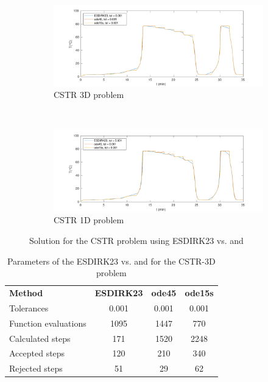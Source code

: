 \begin{figure}[H]
    \centering
    \begin{subfigure}{0.8\linewidth}
        \centering
        \includegraphics[width=1\linewidth]{images/8/8_6_3D.pdf} 
        \caption{CSTR 3D problem}
    \end{subfigure} \\
    \begin{subfigure}{0.8\linewidth}
        \centering
        \includegraphics[width=1\linewidth]{images/8/8_6_1D.pdf}
        \caption{CSTR 1D problem}
    \end{subfigure}
    \caption{Solution for the CSTR problem using ESDIRK23 vs.  and }
    \label{8_6_3D_1D}
\end{figure}

\begin{table}[H]
    \centering
    \begin{tabular}{@{}l|c|c|c@{}}
    \toprule
    \textbf{Method}      & \textbf{ESDIRK23} & \textbf{ode45} & \textbf{ode15s} \\
    Tolerances           & 0.001             & 0.001          & 0.001           \\ \midrule
    Function evaluations & 1095              & 1447           & 770             \\
    Calculated steps     & 171               & 1520           & 2248            \\
    Accepted steps       & 120               & 210            & 340             \\
    Rejected steps       & 51                & 29             & 62              \\ \bottomrule
        \end{tabular}
        \caption{Parameters of the ESDIRK23 vs.  and  for the CSTR-3D problem}
        \label{8_6_3D_table}
    \end{table}


